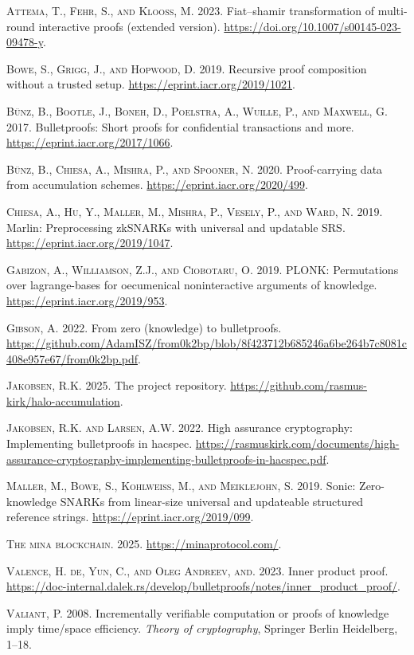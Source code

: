\documentclass[
]{article}
\newlength{\cslhangindent}
\newenvironment{CSLReferences}[2] %
 {\begin{list}{}{%
  \setlength{\itemindent}{0pt}
  \setlength{\leftmargin}{0pt}
  \setlength{\parsep}{0pt}
  \ifodd #1
   \setlength{\leftmargin}{\cslhangindent}
   \setlength{\itemindent}{-1\cslhangindent}
  \fi
  \setlength{\itemsep}{#2\baselineskip}}}
 {\end{list}}
\begin{document}
\label{refs}
\begin{CSLReferences}{1}{1}
\textsc{Attema, T., Fehr, S., and Klooß, M.} 2023. Fiat--shamir
transformation of multi-round interactive proofs (extended version).
\url{https://doi.org/10.1007/s00145-023-09478-y}.

\textsc{Bowe, S., Grigg, J., and Hopwood, D.} 2019. Recursive proof
composition without a trusted setup.
\url{https://eprint.iacr.org/2019/1021}.

\textsc{Bünz, B., Bootle, J., Boneh, D., Poelstra, A., Wuille, P., and
Maxwell, G.} 2017. Bulletproofs: Short proofs for confidential
transactions and more. \url{https://eprint.iacr.org/2017/1066}.

\textsc{Bünz, B., Chiesa, A., Mishra, P., and Spooner, N.} 2020.
Proof-carrying data from accumulation schemes.
\url{https://eprint.iacr.org/2020/499}.

\textsc{Chiesa, A., Hu, Y., Maller, M., Mishra, P., Vesely, P., and
Ward, N.} 2019. Marlin: Preprocessing {zkSNARKs} with universal and
updatable {SRS}. \url{https://eprint.iacr.org/2019/1047}.

\textsc{Gabizon, A., Williamson, Z.J., and Ciobotaru, O.} 2019. {PLONK}:
Permutations over lagrange-bases for oecumenical noninteractive
arguments of knowledge. \url{https://eprint.iacr.org/2019/953}.

\textsc{Gibson, A.} 2022. From zero (knowledge) to bulletproofs.
\url{https://github.com/AdamISZ/from0k2bp/blob/8f423712b685246a6be264b7c8081c408e957e67/from0k2bp.pdf}.

\textsc{Jakobsen, R.K.} 2025. The project repository.
\url{https://github.com/rasmus-kirk/halo-accumulation}.

\textsc{Jakobsen, R.K. and Larsen, A.W.} 2022. High assurance
cryptography: Implementing bulletproofs in hacspec.
\url{https://rasmuskirk.com/documents/high-assurance-cryptography-implementing-bulletproofs-in-hacspec.pdf}.

\textsc{Maller, M., Bowe, S., Kohlweiss, M., and Meiklejohn, S.} 2019.
Sonic: Zero-knowledge {SNARKs} from linear-size universal and updateable
structured reference strings. \url{https://eprint.iacr.org/2019/099}.

\textsc{The mina blockchain}. 2025. \url{https://minaprotocol.com/}.

\textsc{Valence, H. de, Yun, C., and Oleg Andreev, and}. 2023. Inner
product proof.
\url{https://doc-internal.dalek.rs/develop/bulletproofs/notes/inner_product_proof/}.

\textsc{Valiant, P.} 2008. Incrementally verifiable computation or
proofs of knowledge imply time/space efficiency. \emph{Theory of
cryptography}, Springer Berlin Heidelberg, 1--18.

\end{CSLReferences}
\end{document}
